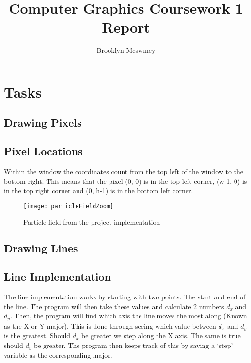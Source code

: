 \documentclass[
	letterpaper, %
	10pt, %
]{CSUniSchoolLabReport}
\title{Computer Graphics Coursework 1 Report} %
\author{Brooklyn Mcswiney} %
\date{ }
\begin{document}
\maketitle %

\pagebreak

\tableofcontents

\pagebreak

\section{Tasks}

\subsection{Drawing Pixels}
\subsection*{Pixel Locations}
Within the window the coordinates count from the top left of the window
to the bottom right. This means that the pixel (0, 0) is in the top left
corner, (w-1, 0) is in the top right corner and (0, h-1) is in the 
bottom left corner.

\begin{figure}[h]
	\centering
	\texttt{[image: particleFieldZoom]}
	\caption{Particle field from the project implementation}
\end{figure}

\subsection{Drawing Lines}
\subsection*{Line Implementation}
\begin{flushleft}
	The line implementation works by starting with two points. The start and
	end of the line. The program will then take these values and calculate 2
	numbers \(d_x\) and \( d_y\). Then, the program will find which axis the
	line moves the most along (Known as the X or Y major). This is done through
	seeing which value between \(d_x\) and \( d_y\) is the greatest. Should \(d_x\)
	be greater we step along the X axis. The same is true should \(d_y\) be greater.
	The program then keeps track of this by saving a `step' variable as the corresponding 
	major.
\end{flushleft}
\end{document}
